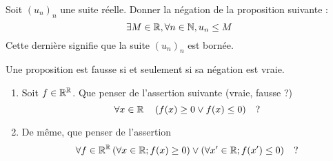 \example
	Soit $(u_n)_n$ une suite réelle. Donner la négation de la proposition suivante :
	\[	
		\exists M \in \mathbb{R}, \forall n \in \mathbb{N}, u_n \leq M
	\]
Cette dernière signifie que la suite  $(u_n)_n$ est bornée.

\Rap
{
	Une proposition est fausse si et seulement si sa négation est vraie.
}

\example 
	\begin{enumerate}
		\item Soit $f\in \mathbb{R}^{\mathbb{R}}$. Que penser de l'assertion suivante (vraie, fausse ?)
		\[	
			\forall x \in \mathbb{R} \quad \left( f(x) \geq 0\lor f(x) \leq 0 \right) \quad ?
		\]
		
		\item De même, que penser de l'assertion 
		\[	
			\forall f\in \mathbb{R}^{\mathbb{R}} \left( \forall x \in \mathbb{R} ;  f(x) \geq 0  \right) \lor \left( \forall x' \in \mathbb{R} ; f(x') \leq 0  \right) \quad  ?
		\]
	\end{enumerate}





